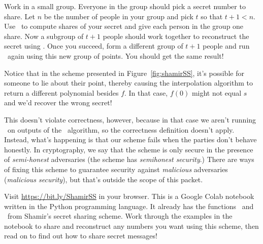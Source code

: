 \begin{bonus}\label{bon:rec-groups}
    Work in a small group. Everyone in the group should pick 
    a secret number to share. Let $n$ be the number of people in 
    your group and pick $t$ so that $t+1 < n$. Use \share~to 
    compute shares of your secret and give each person in the group
    one share. Now a subgroup of $t+1$ people should work together 
    to reconstruct the secret using \rec\footnotemark. Once you succeed, 
    form a different group of $t+1$ people and run \rec~again
    using this new group of points. You should get the same 
    result!
\end{bonus}

Notice that in the scheme presented in Figure~\ref{fig:shamirSS},
it's possible for someone to lie about their point, thereby 
causing the interpolation algorithm to return a different 
polynomial besides $f$. In that case, $f(0)$ might not equal $s$ 
and we'd recover the wrong secret!

This doesn't violate correctness, however, because in that case 
we aren't running \rec~on outputs of the \share~algorithm, so 
the correctness definition doesn't apply. Instead, what's happening 
is that our scheme fails when the parties don't behave honestly.
In cryptography, we say that the scheme is only secure in the 
presence of \emph{semi-honest} adversaries (the scheme has 
\emph{semihonest security}.) There are ways of fixing this scheme 
to guarantee security against \emph{malicious} adversaries 
(\emph{malicious security}), but that's outside the scope of this 
packet.

\begin{exercise}
    Visit \url{https://bit.ly/ShamirSS} in your browser. This is a 
    Google Colab notebook written in the Python programming language. 
    It already has the functions \share~and \rec~from Shamir's secret 
    sharing scheme. Work through the examples in the notebook to 
    share and reconstruct any numbers you want using this scheme, 
    then read on to find out how to share secret messages!
\end{exercise}

